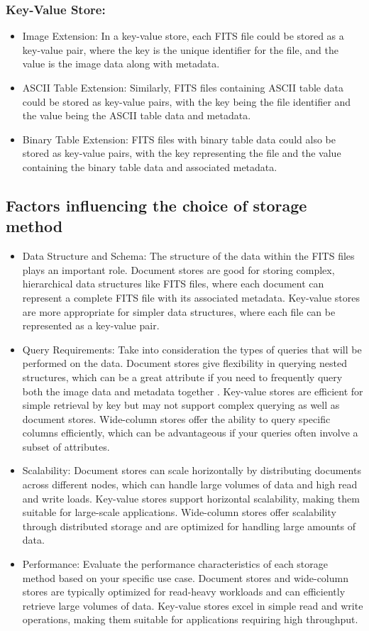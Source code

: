 \documentclass[a4paper,oneside,11pt]{book}
\begin{document}
\subsubsection{Key-Value Store:}
\begin{itemize}
    \item Image Extension: In a key-value store, each FITS file could be stored as a key-value pair, where the key is the unique identifier for the file, and the value is the image data along with metadata.
    \item ASCII Table Extension: Similarly, FITS files containing ASCII table data could be stored as key-value pairs, with the key being the file identifier and the value being the ASCII table data and metadata.
    \item Binary Table Extension: FITS files with binary table data could also be stored as key-value pairs, with the key representing the file and the value containing the binary table data and associated metadata.
\end{itemize}
\subsection{Factors influencing the choice of storage method}
\begin{itemize}
    \item Data Structure and Schema: The structure of the data within the FITS files plays an important role. Document stores are good for storing complex, hierarchical data structures like FITS files, where each document can represent a complete FITS file with its associated metadata. Key-value stores are more appropriate for simpler data structures, where each file can be represented as a key-value pair.
    \item Query Requirements: Take into consideration the types of queries that will be performed on the data. Document stores give flexibility in querying nested structures, which can be a great attribute if you need to frequently query both the image data and metadata together \citep{greisen2002representations}. Key-value stores are efficient for simple retrieval by key but may not support complex querying as well as document stores. Wide-column stores offer the ability to query specific columns efficiently, which can be advantageous if your queries often involve a subset of attributes.
    \item Scalability: Document stores can scale horizontally by distributing documents across different nodes, which can handle large volumes of data and high read and write loads. Key-value stores  support horizontal scalability, making them suitable for large-scale applications. Wide-column stores offer scalability through distributed storage and are optimized for handling large amounts of data.
    \item Performance: Evaluate the performance characteristics of each storage method based on your specific use case. Document stores and wide-column stores are typically optimized for read-heavy workloads and can efficiently retrieve large volumes of data. Key-value stores excel in simple read and write operations, making them suitable for applications requiring high throughput.
\end{itemize}
\end{document}
